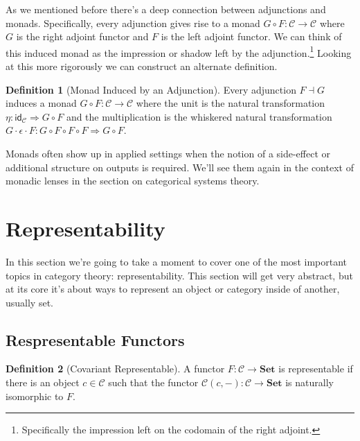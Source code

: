 \documentclass[12pt]{article}
\theoremstyle{definition}
\newtheorem{definition}{Definition}
\begin{document}
As we mentioned before there's a deep connection between adjunctions and monads.
Specifically, every adjunction gives rise to a monad $G \circ F: \mathcal{C} \rightarrow \mathcal{C}$ where $G$ is the right adjoint functor and $F$ is the left adjoint functor.
We can think of this induced monad as the impression or shadow left by the adjunction.\footnote{Specifically the impression left on the codomain of the right adjoint.}
Looking at this more rigorously we can construct an alternate definition.
\begin{definition}[Monad Induced by an Adjunction]
    Every adjunction $F \dashv G$ induces a monad $G \circ F: \mathcal{C} \rightarrow \mathcal{C}$ where the unit is the natural transformation $\eta : \mathsf{id}_\mathcal{C} \Rightarrow G \circ F$ and the multiplication is the whiskered natural transformation $G \cdot \epsilon \cdot F: G \circ F \circ F \circ F \Rightarrow G \circ F$.
\end{definition}

Monads often show up in applied settings when the notion of a side-effect or additional structure on outputs is required.
We'll see them again in the context of monadic lenses in the section on categorical systems theory.




\color{black}
\pagebreak
\section*{Representability}
In this section we're going to take a moment to cover one of the most important topics in category theory: representability.
This section will get very abstract, but at its core it's about ways to represent an object or category inside of another, usually set.

\subsection*{Respresentable Functors}


\begin{definition}[Covariant Representable]
    A functor $F:\mathcal{C}\rightarrow\mathbf{Set}$ is representable if there is an object $c\in\mathcal{C}$ such that the functor $\mathcal{C}(c,-):\mathcal{C}\rightarrow \mathbf{Set}$ is naturally isomorphic to $F$.
\end{definition}
\end{document}
